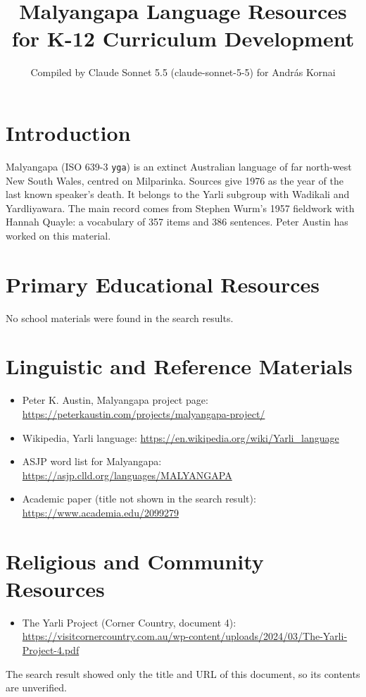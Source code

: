 \documentclass[12pt]{article}
\title{Malyangapa Language Resources for K-12 Curriculum Development}
\author{Compiled by Claude Sonnet 5.5 (claude-sonnet-5-5) for Andr\'as Kornai}
\date{}
\begin{document}
\maketitle

\section{Introduction}
Malyangapa (ISO 639-3 \texttt{yga}) is an extinct Australian language of far north-west New South Wales, centred on Milparinka. Sources give 1976 as the year of the last known speaker's death. It belongs to the Yarli subgroup with Wadikali and Yardliyawara. The main record comes from Stephen Wurm's 1957 fieldwork with Hannah Quayle: a vocabulary of 357 items and 386 sentences. Peter Austin has worked on this material.

\section{Primary Educational Resources}
No school materials were found in the search results.

\section{Linguistic and Reference Materials}
\begin{itemize}
\item Peter K. Austin, Malyangapa project page: \url{https://peterkaustin.com/projects/malyangapa-project/}
\item Wikipedia, Yarli language: \url{https://en.wikipedia.org/wiki/Yarli_language}
\item ASJP word list for Malyangapa: \url{https://asjp.clld.org/languages/MALYANGAPA}
\item Academic paper (title not shown in the search result): \url{https://www.academia.edu/2099279}
\end{itemize}

\section{Religious and Community Resources}
\begin{itemize}
\item The Yarli Project (Corner Country, document 4): \url{https://visitcornercountry.com.au/wp-content/uploads/2024/03/The-Yarli-Project-4.pdf}
\end{itemize}
The search result showed only the title and URL of this document, so its contents are unverified.
\end{document}
